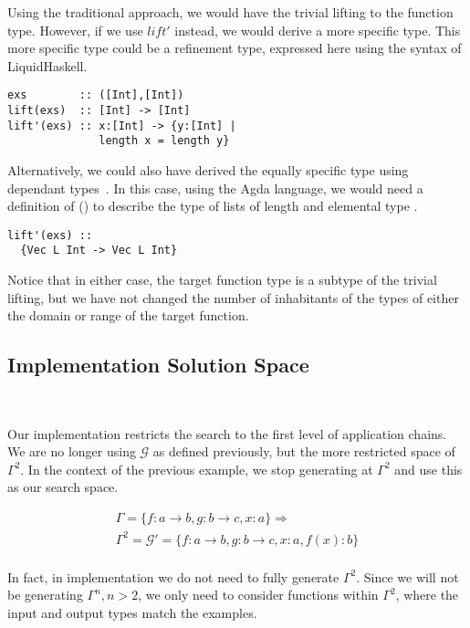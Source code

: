 Using the traditional approach, we would have the trivial lifting to the function type.
However, if we use $lift'$ instead, we would derive a more specific type.
This more specific type could be a refinement type, expressed here using the syntax of LiquidHaskell\cite{DBLP:conf/icfp/VazouSJVJ14}.
 
\begin{lstlisting}
exs        :: ([Int],[Int])
lift(exs)  :: [Int] -> [Int] 
lift'(exs) :: x:[Int] -> {y:[Int] |
              length x = length y}
\end{lstlisting}

Alternatively, we could also have derived the equally specific type using dependant types~\cite{DBLP:journals/jfp/McBride02}.
In this case, using the Agda language, we would need a definition of () to describe the type of lists of length  and elemental type .

\begin{lstlisting}
lift'(exs) ::
  {Vec L Int -> Vec L Int}
\end{lstlisting}

Notice that in either case, the target function type is a subtype of the trivial lifting, but we have not changed the number of inhabitants of the types of either the domain or range of the target function.

\subsection{Implementation Solution Space}\label{solnSpace}\

Our implementation restricts the search to the first level of application chains.
We are no longer using $\mathcal{G}$ as defined previously, but the more restricted space of $\Gamma^2$.
In the context of the previous example, we stop generating at $\Gamma^2$ and use this as our search space.

\begin{gather*}
\Gamma = \{f:a\to b, g:b\to c, x:a\} \Rightarrow \\
\Gamma^2 = \mathcal{G}' = \{f:a\to b, g:b\to c, x:a, f(x):b\}\\
\end{gather*}

In fact, in implementation we do not need to fully generate $\Gamma^2$.
Since we will not be generating $\Gamma^n, n>2$, we only need to consider functions within $\Gamma^2$, where the input and output types match the examples.

